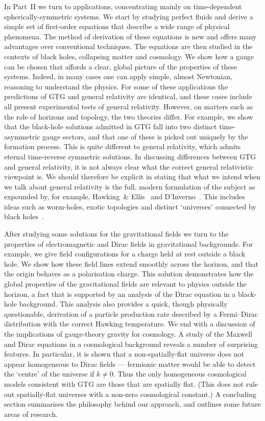 \documentclass[a4paper]{article}
\numberwithin{equation}{section}
\begin{document}
In Part~II we turn to applications, concentrating mainly on
time-dependent spherically-symmetric systems.  We start by studying
perfect fluids and derive a simple set of first-order equations that
describe a wide range of physical phenomena.  The method of derivation
of these equations is new and offers many advantages over conventional
techniques.  The equations are then studied in the contexts of black
holes, collapsing matter and cosmology.  We show how a gauge can be
chosen that affords a clear, global picture of the properties of these
systems.  Indeed, in many cases one can apply simple, almost
Newtonian, reasoning to understand the physics.  For some of these
applications the predictions of GTG and general relativity are
identical, and these cases include all present experimental tests of
general relativity.  However, on matters such as the role of horizons
and topology, the two theories differ.  For example, we show that the
black-hole solutions admitted in GTG fall into two distinct
time-asymmetric gauge sectors, and that one of these is picked out
uniquely by the formation process.  This is quite different to general
relativity, which admits eternal time-reverse symmetric solutions.  In
discussing differences between GTG and general relativity, it is not
always clear what the correct general relativistic viewpoint is.  We
should therefore be explicit in stating that what we intend when we
talk about general relativity is the full, modern formulation of the
subject as expounded by, for example, Hawking~\&
Ellis~\cite{haw-large} and D'Inverno~\cite{inv-rel}.  This includes
ideas such as worm-holes, exotic topologies and distinct `universes'
connected by black holes~\cite{kauf-front,haw-black}.


After studying some solutions for the gravitational fields we turn to
the properties of electromagnetic and Dirac fields in gravitational
backgrounds.  For example, we give field configurations for a charge
held at rest outside a black hole.  We show how these field lines
extend smoothly across the horizon, and that the origin behaves as a
polarisation charge.  This solution demonstrates how the global
properties of the gravitational fields are relevant to physics outside
the horizon, a fact that is supported by an analysis of the Dirac
equation in a black-hole background.  This analysis also provides a
quick, though physically questionable, derivation of a particle
production rate described by a Fermi--Dirac distribution with the
correct Hawking temperature.  We end with a discussion of the
implications of gauge-theory gravity for cosmology.  A study of the
Maxwell and Dirac equations in a cosmological background reveals a
number of surprising features.  In particular, it is shown that a
non-spatially-flat universe does not appear homogeneous to Dirac
fields --- fermionic matter would be able to detect the `centre' of
the universe if $k\neq 0$.  Thus the only homogeneous cosmological
models consistent with GTG are those that are spatially flat.  (This
does not rule out spatially-flat universes with a non-zero
cosmological constant.)  A concluding section summarises the
philosophy behind our approach, and outlines some future areas of
research.
\end{document}
